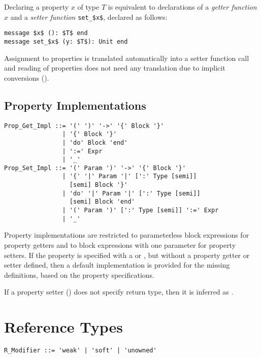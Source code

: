 Declaring a property $x$ of type $T$ is equivalent to declarations of a {\em getter function} $x$ and a {\em setter function} \lstinline!set_$x$!, declared as follows:

\begin{lstlisting}
message $x$ (): $T$ end
message set_$x$ (y: $T$): Unit end
\end{lstlisting}

Assignment to properties is translated automatically into a setter function call and reading of properties does not need any translation due to implicit conversions (). 






\subsection{Property Implementations}
\label{sec:property-impl}

\begin{lstlisting}
Prop_Get_Impl ::= '(' ')' '->' '{' Block '}'
                | '{' Block '}'
                | 'do' Block 'end'
                | ':=' Expr
                | '_'
Prop_Set_Impl ::= '(' Param ')' '->' '{' Block '}'
                | '{' '|' Param '|' [':' Type [semi]] 
                  [semi] Block '}'
                | 'do' '|' Param '|' [':' Type [semi]] 
                  [semi] Block 'end' 
                | '(' Param ')' [':' Type [semi]] ':=' Expr
                | '_'
\end{lstlisting}

Property implementations are restricted to parameterless block expressions for property getters and to block expressions with one parameter for property setters. If the property is specified with a  or , but without a property getter or setter defined, then a default implementation is provided for the missing definitions, based on the property specifications. 

If a property setter () does not specify return type, then it is inferred as . 





\section{Reference Types}
\label{sec:ref-types}

\grammar\begin{lstlisting}
R_Modifier ::= 'weak' | 'soft' | 'unowned'
\end{lstlisting}

